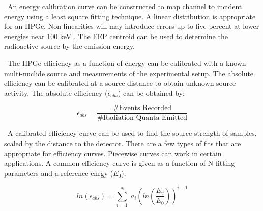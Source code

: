 \documentclass[journal]{IEEEtran}
\begin{document}
	\ An energy calibration curve can be constructed to map channel to incident energy using a least square fitting technique. 
A linear distribution is appropriate for an HPGe. 
Non-linearities will may introduce errors up to five percent at lower energies near 100 keV \cite{Knoll}. 
The FEP centroid can be	used to determine the radioactive source by the emission energy.

	\ The HPGe efficiency as a function of energy can be calibrated with a known multi-nuclide source and measurements of the experimental setup. 
The absolute efficiency can be calibrated at a source distance to obtain unknown source activity\cite{Knoll}. 
The absolute efficiency ($\epsilon_{abs}$) can be obtained by:
	
	\begin{equation} \label{eq:effa}
	\epsilon_{abs} =\frac{\text{\# Events Recorded}}{\text{\# Radiation Quanta Emitted}}
	\end{equation}
	
	\ A calibrated efficiency curve can be used to find the source strength of samples, scaled by the distance to the detector. 
There are a few types of fits that are appropriate for efficiency curves. 
Piecewise curves can work in certain applications. 
A common efficiency curve is given as a function of N fitting parameters and a reference enrgy ($E_{0}$):
	
	\begin{equation} \label{eq:effa1}
    ln(\epsilon_{abs}) =   \sum_{i=1}^{N} \; a_{i} (ln(\dfrac{E_{\gamma}}{E_{0}}))^{i-1}
	\end{equation}
	
\end{document}
